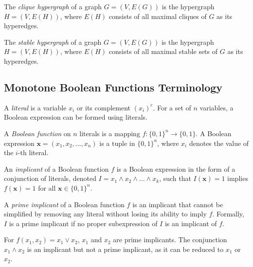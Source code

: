 \begin{definition}
The \emph{clique hypergraph} of a graph $G=(V,E(G))$ is the hypergraph $H=(V,E(H))$, where $E(H)$ consists of all maximal cliques of $G$ as its hyperedges.
\end{definition}

\begin{definition}
The \emph{stable hypergraph} of a graph $G=(V,E(G))$ is the hypergraph $H=(V,E(H))$, where $E(H)$ consists of all maximal stable sets of $G$ as its hyperedges.
\end{definition}

\subsection{Monotone Boolean Functions Terminology}

\begin{definition}
A \emph{literal} is a variable $x_i$ or its complement $(x_i)^c$. For a set of $n$ variables, a Boolean expression can be formed using literals.
\end{definition}

\begin{definition}
A \emph{Boolean function} on $n$ literals is a mapping $f:\{0,1\}^n\to\{0,1\}$. A Boolean expression $\mathbf{x}=(x_1,x_2,\dots,x_n)$ is a tuple in $\{0,1\}^n$, where $x_i$ denotes the value of the $i$-th literal.
\end{definition}

\begin{definition}
An \emph{implicant} of a Boolean function $f$ is a Boolean expression in the form of a conjunction of literals, denoted $I=x_1\wedge x_2\wedge\dots\wedge x_k$, such that $I(\mathbf{x})=1$ implies $f(\mathbf{x})=1$ for all $\mathbf{x}\in\{0,1\}^n$.
\end{definition}

\begin{definition}
A \emph{prime implicant} of a Boolean function $f$ is an implicant that cannot be simplified by removing any literal without losing its ability to imply $f$. Formally, $I$ is a prime implicant if no proper subexpression of $I$ is an implicant of $f$.
\end{definition}

\begin{example}
For $f(x_1,x_2)=x_1\vee x_2$, $x_1$ and $x_2$ are prime implicants. The conjunction $x_1\wedge x_2$ is an implicant but not a prime implicant, as it can be reduced to $x_1$ or $x_2$.
\end{example}

